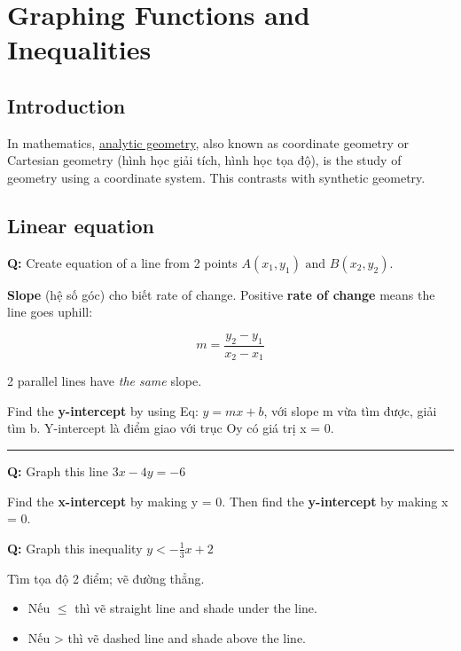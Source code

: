 \chapter{Graphing Functions and Inequalities}

\section{Introduction}

In mathematics, \href{https://en.wikipedia.org/wiki/Analytic_geometry}{analytic geometry}, also known as coordinate geometry or Cartesian geometry (hình học giải tích, hình học tọa độ), is the study of geometry using a coordinate system. This contrasts with synthetic geometry. 

\section{Linear equation}

\textbf{Q:} Create equation of a line from 2 points \(A(x_{1},y_{1})\text{ and } B(x_{2},y_{2})\).

\textbf{Slope} (hệ số góc) cho biết rate of change. Positive \textbf{rate of change} means the line goes uphill:

\begin{equation}
  m = \frac{y_{2}-y_{1}}{x_{2}-x_{1}}
  \label{eq:3.1}
\end{equation}

2 parallel lines have \textit{the same} slope.

Find the \textbf{y-intercept} by using Eq: \(y = mx + b\), với slope m vừa tìm được, giải tìm b. Y-intercept là điểm giao với trục Oy có giá trị x = 0.

\par\rule{\textwidth}{0.5pt}

\textbf{Q:} Graph this line \(3x-4y=-6\)

Find the \textbf{x-intercept} by making y = 0. Then find the \textbf{y-intercept} by making x = 0.

\vspace{5mm}

\textbf{Q:} Graph this inequality \(y < -\frac{1}{3}x+2\)

Tìm tọa độ 2 điểm; vẽ đường thẳng.

\begin{itemize}
  \item Nếu \(\le\) thì vẽ straight line and shade under the line.
  \item Nếu > thì vẽ dashed line and shade above the line.
\end{itemize}

